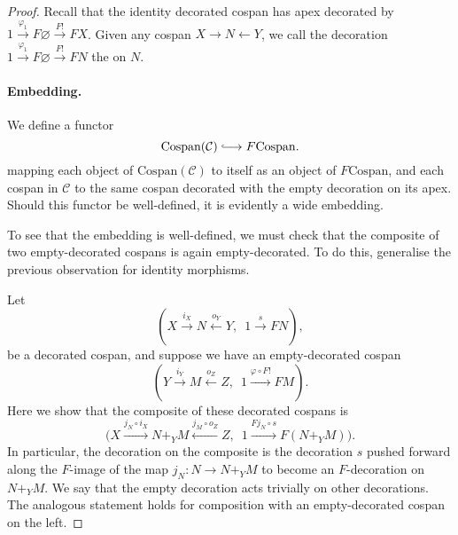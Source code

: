 \begin{proof}
  Recall that the identity decorated cospan has apex decorated by $1
  \stackrel{\varphi_1}\longrightarrow F\varnothing \stackrel{F!}\longrightarrow
  FX$. Given any cospan $X \to N \leftarrow Y$, we call the decoration $1
  \stackrel{\varphi_1}\longrightarrow F\varnothing \stackrel{F!}\longrightarrow
  FN$ the  on $N$. 
  
\paragraph{Embedding.} 
  We define a functor 
  \[
    \mathrm{Cospan(\mathcal C)} \hooklongrightarrow F\mathrm{Cospan}.
  \]
  mapping each object of $\mathrm{Cospan(\mathcal C)}$ to itself as an object
  of $F\mathrm{Cospan}$, and each cospan in $\mathcal C$ to the same cospan
  decorated with the empty decoration on its apex. Should this functor be
  well-defined, it is evidently a wide embedding.
  
  To see that the embedding is
  well-defined, we must check that the composite of two empty-decorated cospans
  is again empty-decorated. To do this, generalise the previous observation for
  identity morphisms. 
  
  Let
\[
  (X \stackrel{i_X}\longrightarrow N
\stackrel{o_Y}\longleftarrow Y,\enspace 1 \stackrel{s}\longrightarrow FN),
\]
be a decorated cospan, and suppose we have an empty-decorated cospan 
\[
  (Y \stackrel{i_Y}\longrightarrow M \stackrel{o_Z}\longleftarrow Z,\enspace 1
  \stackrel{\varphi\circ F!}\longrightarrow FM).
\]
Here we show that the composite of these decorated cospans is 
\[
  \big(X \stackrel{j_N \circ i_X}\longrightarrow N+_YM \stackrel{j_M \circ
  o_Z}\longleftarrow Z,\enspace 1 \stackrel{Fj_N \circ s}\longrightarrow
  F(N+_YM)\big).
\]
In particular, the decoration on the composite is the decoration $s$ pushed
forward along the $F$-image of the map $j_N\colon N \to N+_YM$ to become an
$F$-decoration on $N+_YM$. We say that the empty decoration acts trivially on
other decorations. The analogous statement holds for composition with an
empty-decorated cospan on the left.


\end{proof}
